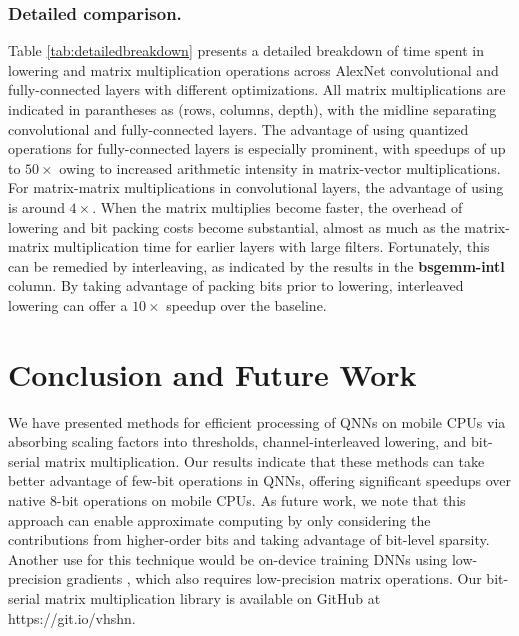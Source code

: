 \documentclass[sigconf]{acmart}
\begin{document}
\subsubsection{Detailed comparison.}
Table \ref{tab:detailedbreakdown} presents a detailed breakdown of time spent in lowering and matrix multiplication operations across AlexNet convolutional and fully-connected layers with different optimizations.
All matrix multiplications are indicated in parantheses as (rows, columns, depth), with the midline separating convolutional and fully-connected layers.
The advantage of using quantized operations for fully-connected layers is especially prominent, with speedups of up to $50\times$ owing to increased arithmetic intensity in matrix-vector multiplications.
For matrix-matrix multiplications in convolutional layers, the advantage of using  \ours{} is around $4\times$.
When the matrix multiplies become faster, the overhead of lowering and bit packing costs become substantial, almost as much as the matrix-matrix multiplication time for earlier layers with large filters.
Fortunately, this can be remedied by interleaving, as indicated by the results in the \textbf{bsgemm-intl} column.
By taking advantage of packing bits prior to lowering, interleaved lowering can offer a $10\times$ speedup over the baseline.


\section{Conclusion and Future Work}
We have presented methods for efficient processing of QNNs on mobile CPUs via absorbing scaling factors into thresholds, channel-interleaved lowering, and bit-serial matrix multiplication.
Our results indicate that these methods can take better advantage of few-bit operations in QNNs, offering significant speedups over native 8-bit operations on mobile CPUs. As future work, we note that this approach can enable approximate computing by only considering the contributions from higher-order bits and taking advantage of bit-level sparsity.
Another use for this technique would be on-device training DNNs using low-precision gradients \cite{lowprecsgd}, which also requires low-precision matrix operations.
Our bit-serial matrix multiplication library is available on GitHub at https://git.io/vhshn.



\end{document}
